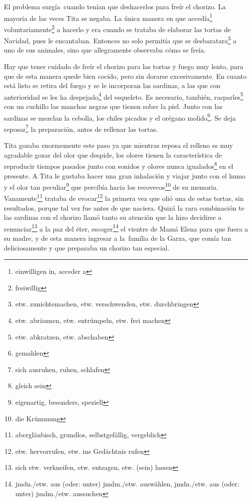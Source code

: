 El problema surgía~cuando tenían que deshacerlos para freír el
chorizo. La mayoria de las veces Tita se negaba. La única manera en que accedía\footnote{einwilligen in, acceder a} voluntariamente\footnote{freiwillig} a hacerlo y era cuando
se trataba de elaborar las tortas de Navidad, pues le encantaban.
Entonces no solo permitía que se desbaratara\footnote{etw. zunichtemachen, etw. verschwenden, etw. durchbringen}
a uno de sus animales, sino que allegramente observaba cómo se freía.

Hay que tener cuidado de freír el chorizo para las tortas y fuego muy
lento, para que de esta manera quede bien cocido, pero sin dorarse
excesivamente. En cuanto está listo se retira del fuego y se le
incorporan las sardinas, a las que con anterioridad se les ha despejado\footnote{etw. abräumen, etw. entrümpeln, etw. frei machen}
del esqueleto. Es necesario, también, rasparles\footnote{etw. abkratzen, etw. abschaben}
con un cuchillo las manchas negras que tienen sobre la piel.
Junto con las sardinas se mezclan la cebolla, los chiles picados y
el orégano molido\footnote{gemahlen}. Se deja reposar\footnote{sich ausruhen, ruhen, schlafen} la preparación,
antes de rellenar las tortas.

Tita gozaba enormemente este paso ya que mientras reposa el relleno es
muy agradable gozar del olor que despide, los olores tienen la
característica de reproducir tiempos pasados junto con sonidos y olores
nunca igualados\footnote{gleich sein} en el presente. A Tita le
gustaba hacer una gran inhalación y viajar junto con el humo y el olor
tan peculiar\footnote{eigenartig, besonders, speziell} que
percibía hacia los recovecos\footnote{die Krümmung} de su
memoria.
 Vanamente\footnote{abergläubisch, grundlos, selbstgefällig, vergeblich}
trataba de evocar\footnote{etw. hervorrufen, etw. ins Gedächtnis rufen}
la primera vez que olió una de estas tortas, sin resultados, porque tal
vez fue antes de que naciera. Quizá la rara combinación te las sardinas
con el chorizo llamó tanto su atención que la hizo decidirse a renunciar\footnote{sich etw. verkneifen, etw. entsagen, etw. (sein) lassen}
a la paz del éter, escoger\footnote{jmdn./etw. aus (oder: unter) jmdm./etw. auswählen, jmdn./etw. aus (oder: unter) jmdm./etw. aussuchen}
el vientre de Mamá Elena para que fuera a su madre, y de esta manera
ingresar a la~familia de la Garza, que comía tan deliciosamente
y que preparaba un chorizo tan especial.

